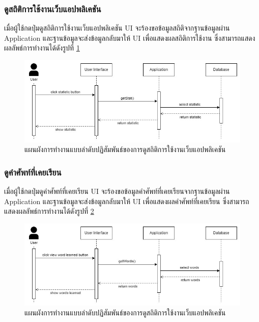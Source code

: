 \documentclass[12pt,oneside,openright,a4paper]{cpe-thai-project}
\begin{document}
\pagebreak
\subsubsection{ดูสถิติการใช้งานเว็บแอปพลิเคชัน}
\hspace{1cm}
เมื่อผู้ใช้กดปุ่มดูสถิติการใช้งานเว็บแอปพลิเคชัน UI จะร้องขอข้อมูลสถิติจากฐานข้อมูลผ่าน Application
และฐานข้อมูลจะส่งข้อมูลกลับมาให้ UI เพื่อแสดงผลสถิติการใช้งาน ซึ่งสามารถแสดงผลลัพธ์การทำงานได้ดังรูปที่ \ref{fig:S_Statistic}
\begin{figure}[!h]\centering
	\includegraphics[width=\textwidth, keepaspectratio=true]{image/chap3/sequence/Statistic.jpg}
	\caption{แผนผังการทำงานแบบลำดับปฏิสัมพันธ์ของการดูสถิติการใช้งานเว็บแอปพลิเคชัน}\label{fig:S_Statistic}
\end{figure}

\subsubsection{ดูคำศัพท์ที่เคยเรียน}
\hspace{1cm}
เมื่อผู้ใช้กดปุ่มดูคำศัพท์ที่เคยเรียน UI จะร้องขอข้อมูลคำศัพท์ที่เคยเรียนจากฐานข้อมูลผ่าน Application
และฐานข้อมูลจะส่งข้อมูลกลับมาให้ UI เพื่อแสดงผลคำศัพท์ที่เคยเรียน ซึ่งสามารถแสดงผลลัพธ์การทำงานได้ดังรูปที่ \ref{fig:S_WordsLearned}
\begin{figure}[!h]\centering
	\includegraphics[width=\textwidth, keepaspectratio=true]{image/chap3/sequence/Words Learned.jpg}
	\caption{แผนผังการทำงานแบบลำดับปฏิสัมพันธ์ของการดูสถิติการใช้งานเว็บแอปพลิเคชัน}\label{fig:S_WordsLearned}
\end{figure}
\end{document}

